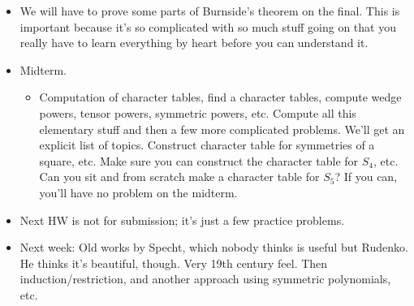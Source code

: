 \documentclass[../notes.tex]{subfiles}
\begin{document}
\begin{itemize}
\begin{proof}
        It follows that the sum in the above equation is divisible by $pq$. Thus,
        \begin{equation*}
            \frac{1}{pq} = \Bigg( \underbrace{p^{a-1}q^{b-1}\vphantom{\sum_{|C|>1}}}_{\in\Z}-\underbrace{\frac{1}{pq}\sum_{|C|>1}|C|}_{\in\Z} \Bigg)
        \end{equation*}
        That is to say, $1/pq$ (which is clearly not an integer) is equal to an integer, a contradiction.
    \end{proof}
    \item We will have to prove some parts of Burnside's theorem on the final. This is important because it's so complicated with so much stuff going on that you really have to learn everything by heart before you can understand it.
    \item Midterm.
    \begin{itemize}
        \item Computation of character tables, find a character tables, compute wedge powers, tensor powers, symmetric powers, etc. Compute all this elementary stuff and then a few more complicated problems. We'll get an explicit list of topics. Construct character table for symmetries of a square, etc. Make sure you can construct the character table for $S_4$, etc. Can you sit and from scratch make a character table for $S_5$? If you can, you'll have no problem on the midterm.
    \end{itemize}
    \item Next HW is not for submission; it's just a few practice problems.
    \item Next week: Old works by Specht, which nobody thinks is useful but Rudenko. He thinks it's beautiful, though. Very 19th century feel. Then induction/restriction, and another approach using symmetric polynomials, etc.
\end{itemize}
\end{document}

